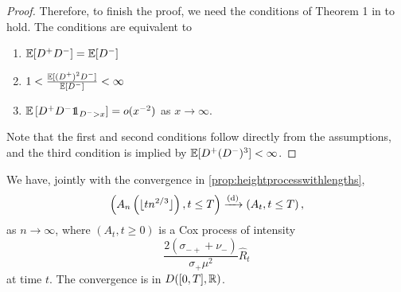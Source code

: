 \begin{proof}
Therefore, to finish the proof, we need the conditions of Theorem 1 in \cite{deraphelisScalingLimitMultitype2017} to hold. The conditions are equivalent to 
\begin{enumerate}
    \item ${\mathbb E}[D^+D^-]={\mathbb E}[D^-]$
    \item $1<\frac{{\mathbb E}[(D^+)^2D^-]}{{\mathbb E}[D^-]}<\infty$
    \item $\E\left[D^+D^-\one_{D^->x}\right]=o(x^{-2})$ as $x\to \infty$. 
\end{enumerate}
Note that the first and second conditions follow directly from the assumptions, and the third condition is implied by ${\mathbb E}[D^+(D^-)^3]<\infty$.
\end{proof}



\begin{proposition}\label{prop.convergenceancestraledges}
We have, jointly with the convergence in \cref{prop:heightprocesswithlengths},
\begin{align*}\left(A_n\left(\lfloor tn^{2/3}\rfloor\right),t\leq T\right)\xrightarrow[]{\mathrm{(d)}}\left(A_t,t\leq T\right),\end{align*}
as $n\to \infty$, where $(A_t,t\geq 0)$ is a Cox process of intensity $$\frac{2(\sigma_{-+}+\nu_-)}{\sigma_+\mu^2} \hat{R}_t$$ at time $t$. The convergence is in $D([0,T],{\mathbb R})$.
\end{proposition}



